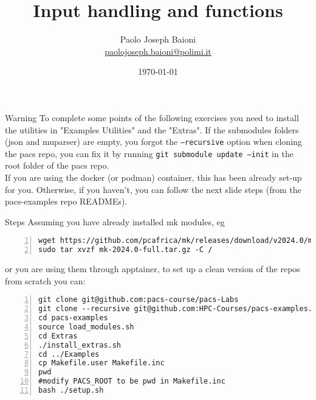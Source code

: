 \documentclass[10pt,aspectratio=169]{beamer}
\begin{document}
    \title{Input handling and functions}
\author{Paolo Joseph Baioni\\ \href{mailto:paolojoseph.baioni@polimi.it}{\color{blue}paolojoseph.baioni@polimi.it}}
\date{\today}
    
\begin{frame}
    \maketitle
\end{frame}

\begin{frame}{Warning}
    To complete some points of the following exercises you need to install the utilities in "Examples Utilities" and the "Extras". If the submodules folders (json and muparser) are empty, you forgot the \texttt{--recursive} option when cloning the pacs repo, you can fix it by running \texttt{git submodule update --init} in the root folder of the pacs repo.\\

    \noindent If you are using the docker (or podman) container, this has been already set-up for you. Otherwise, if you haven't, you can follow the next slide steps (from the pacs-examples repo READMEs).
\end{frame}

\begin{frame}[fragile]{Steps}
Assuming you have already installed mk modules, eg
\begin{lstlisting}[frame=single, style=cpp, firstnumber=1, numbers=left, numberstyle=\tiny,showtabs=false,xleftmargin=.05\linewidth,xrightmargin=.025\linewidth]
wget https://github.com/pcafrica/mk/releases/download/v2024.0/mk-2024.0-full.tar.gz
sudo tar xvzf mk-2024.0-full.tar.gz -C /
\end{lstlisting}
or you are using them through apptainer, to set up a clean version of the repos from scratch you can:
\begin{lstlisting}[frame=single, style=cpp, firstnumber=1, numbers=left, numberstyle=\tiny,showtabs=false,xleftmargin=.05\linewidth,xrightmargin=.025\linewidth]
git clone git@github.com:pacs-course/pacs-Labs
git clone --recursive git@github.com:HPC-Courses/pacs-examples.git --branch master
cd pacs-examples
source load_modules.sh
cd Extras
./install_extras.sh
cd ../Examples
cp Makefile.user Makefile.inc
pwd
#modify PACS_ROOT to be pwd in Makefile.inc
bash ./setup.sh
\end{lstlisting}
    
\end{frame}
\end{document}
